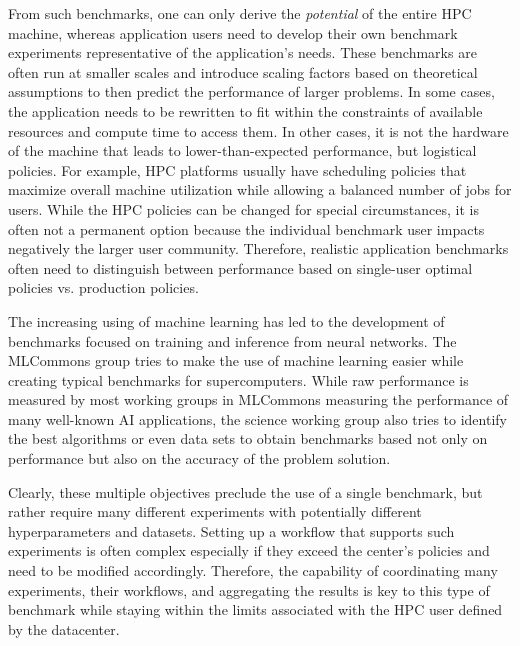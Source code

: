 From such benchmarks, one can only derive the {\em potential} of the entire HPC machine, whereas application users need to develop their own benchmark experiments representative of the application's needs. These benchmarks are often run at smaller scales and introduce scaling factors based on theoretical assumptions to then predict the performance of larger problems. In some cases, the application needs to be rewritten to fit within the constraints of available resources and compute time to access them. In other cases, it is not the hardware of the machine that leads to lower-than-expected performance, but logistical policies. For example, HPC platforms usually have scheduling policies that maximize overall machine utilization while allowing a balanced number of jobs for users. While the HPC policies can be changed for special circumstances, it is often not a permanent option because the individual benchmark user impacts negatively the larger user community. Therefore, realistic application benchmarks often need to distinguish between performance based on single-user optimal policies vs. production policies. 

The increasing using of machine learning has led to the development of benchmarks focused on training and inference from neural networks. The MLCommons group tries to make the use of machine learning easier while creating typical benchmarks for supercomputers. While raw performance is measured by most working groups in MLCommons measuring the performance of many well-known AI applications, the science working group also tries to identify the best algorithms or even data sets to obtain benchmarks based not only on performance but also on the accuracy of the problem solution.

Clearly, these multiple objectives preclude the use of a single benchmark, but rather require many different experiments with potentially different hyperparameters and datasets. Setting up a workflow that supports such experiments is often complex especially if they exceed the center's policies and need to be modified accordingly. Therefore, the capability of coordinating many experiments, their workflows, and aggregating the results is key to this type of benchmark while staying within the limits associated with the HPC user defined by the datacenter.

